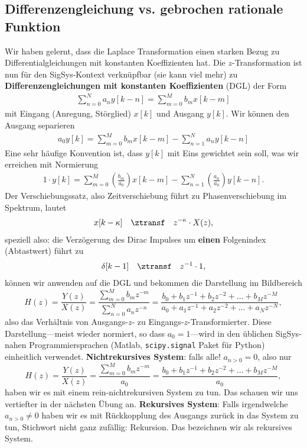 \subsection*{Differenzengleichung vs. gebrochen rationale Funktion}
Wir haben gelernt, dass die Laplace Transformation einen starken Bezug zu
Differentialgleichungen mit konstanten Koeffizienten hat.
%
Die $z$-Transformation ist nun für den SigSys-Kontext verknüpfbar
(sie kann viel mehr) zu
\textbf{Differenzengleichungen mit konstanten Koeffizienten} (DGL) der Form
\begin{align}
\sum_{n=0}^N a_n y[k-n] = \sum_{m=0}^M b_m x[k-m]
\end{align}
mit Eingang (Anregung, Störglied) $x[k]$ und Ausgang $y[k]$.
%
Wir können den Ausgang separieren
\begin{align}
a_0 y[k] = \sum_{m=0}^M b_m x[k-m] - \sum_{n=1}^N a_n y[k-n]
\end{align}
%
Eine sehr häufige Konvention ist, dass $y[k]$ mit Eins gewichtet sein soll, was wir erreichen mit
Normierung
\begin{align}
1 \cdot y[k] = \sum_{m=0}^M \left(\frac{b_m}{a_0}\right) x[k-m] - \sum_{n=1}^N \left(\frac{a_n}{a_0}\right) y[k-n].
\end{align}
%
Der Verschiebungssatz, also Zeitverschiebung führt zu
Phasenverschiebung im Spektrum, lautet
\begin{align}
x[k-\kappa] \quad\ztransf\quad z^{-\kappa} \cdot X(z),
\end{align}
speziell also: die Verzögerung des Dirac Impulses um \textbf{einen} Folgenindex (Abtastwert)
führt zu
\begin{align}
\delta[k-1] \quad\ztransf\quad z^{-1} \cdot 1,
\end{align}
können wir anwenden auf die DGL und bekommen die Darstellung im Bildbereich
\begin{equation}
H(z) = \frac{Y(z)}{X(z)} =
\frac{\sum\limits_{m=0}^{M} b_m z^{-m}}{\sum\limits_{n=0}^{N} a_n z^{-n}}=
\frac{b_0 + b_1 z^{-1} + b_2 z^{-2} + \dots + b_M z^{-M}}{a_0 + a_1 z^{-1} + a_2 z^{-2} + \dots + a_N z^{-N}},
\end{equation}
also das Verhältnis von Ausgangs-$z$- zu Eingangs-$z$-Transformierter.
Diese Darstellung---meist wieder normiert, so dass $a_0=1$---wird in
den üblichen SigSys-nahen Programmiersprachen (Matlab,
\texttt{scipy.signal} Paket für Python) einheitlich verwendet.
\textbf{Nichtrekursives System}: falls alle! $a_{n>0} = 0$, also nur
\begin{equation}
H(z) = \frac{Y(z)}{X(z)} =
\frac{\sum\limits_{m=0}^{M} b_m z^{-m}}{a_0}=
\frac{b_0 + b_1 z^{-1} + b_2 z^{-2} + \dots + b_M z^{-M}}{a_0},
\end{equation}
haben wir es mit einem rein-nichtrekursiven System zu tun. Das schauen wir uns
vertiefter in der nächsten Übung an.
%
\textbf{Rekursives System}: Falls irgendwelche
$a_{n>0} \neq 0$ haben wir es mit Rückkopplung des Ausgangs zurück in das System zu tun,
Stichwort nicht ganz zufällig: Rekursion. Das bezeichnen wir als rekursives System.

